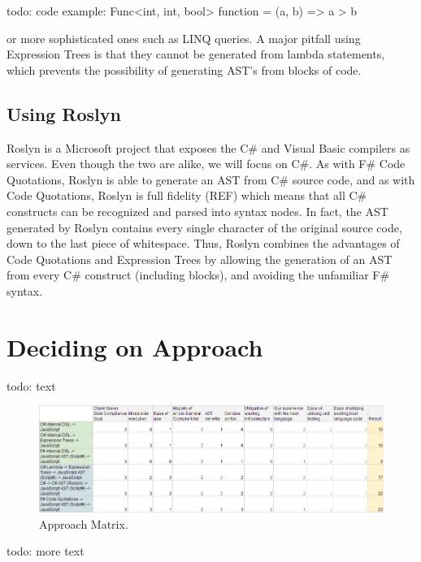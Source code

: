 			todo: code example: Func<int, int, bool> function = (a, b) => a > b

			or more sophisticated ones such as LINQ queries.  A major pitfall using Expression Trees is that they cannot be generated from lambda statements, which prevents the possibility of generating AST’s from blocks of code.

		\subsection{Using Roslyn} %
		\label{sub:using_roslyn}
			Roslyn is a Microsoft project that exposes the C\# and Visual Basic compilers as services. Even though the two are alike, we will focus on C\#. As with F\# Code Quotations, Roslyn is able to generate an AST from C\# source code, and as with Code Quotations, Roslyn is full fidelity (REF) which means that all C\# constructs can be recognized and parsed into syntax nodes. In fact, the AST generated by Roslyn contains every single character of the original source code, down to the last piece of whitespace. Thus, Roslyn combines the advantages of Code Quotations and Expression Trees by allowing the generation of an AST from every C\# construct (including blocks), and avoiding the unfamiliar F\# syntax.


\section{Deciding on Approach} %
\label{sec:deciding_on_approach}
	todo: text

						\begin{figure}[H]
			\begin{center}
				\centerline{\includegraphics[width=14cm]{resources/images/ApproachMatrix.png}}
			\end{center}
			\caption{Approach Matrix.}
			\label{approachMatrix}
		\end{figure}

	todo: more text
